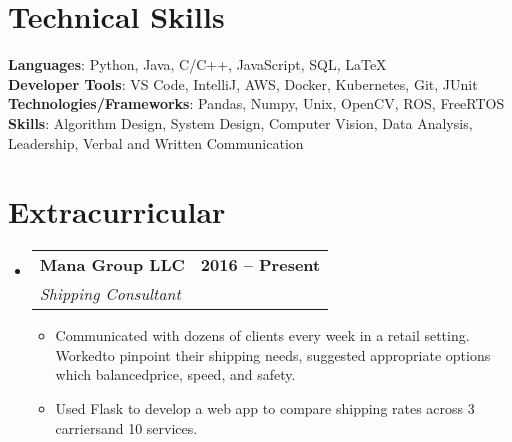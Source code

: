\documentclass[letterpaper,11pt]{article}
\makeatletter
\newcommand{\resumeItem}[1]{
  \item\small{
    {#1 \vspace{-2pt}}
  }
}
\newcommand{\resumeSubheading}[4]{
  \vspace{-2pt}\item
    \begin{tabular*}{1.0\textwidth}[t]{l@{\extracolsep{\fill}}r}
      \textbf{#1} & \textbf{\small #2} \\
      \textit{\small#3} & \textit{\small #4} \\
    \end{tabular*}\vspace{-7pt}
}
\newcommand{\resumeSubHeadingListStart}{\begin{itemize}[leftmargin=0.0in, label={}]}
\newcommand{\resumeSubHeadingListEnd}{\end{itemize}}
\newcommand{\resumeItemListStart}{\begin{itemize}}
\newcommand{\resumeItemListEnd}{\end{itemize}\vspace{-5pt}}
\makeatother
\begin{document}
\section{Technical Skills}
 \begin{itemize}[leftmargin=0.15in, label={}]
    \small{\item{
     \textbf{Languages}{: Python, Java, C/C++, JavaScript, SQL, \LaTeX} \\
     \textbf{Developer Tools}{: VS Code, IntelliJ, AWS, Docker, Kubernetes, Git, JUnit} \\
     \textbf{Technologies/Frameworks}{: Pandas, Numpy, Unix, OpenCV, ROS, FreeRTOS} \\
     \textbf{Skills}{: Algorithm Design, System Design, Computer Vision, Data Analysis, Leadership, Verbal and Written Communication}\\
    }}
 \end{itemize}
 \vspace{-16pt}


\section{Extracurricular}
    \resumeSubHeadingListStart
        \resumeSubheading{Mana Group LLC}{2016 -- Present}{Shipping Consultant}{}
            \resumeItemListStart
                \resumeItem{Communicated with dozens of clients every week in a retail setting. Workedto pinpoint their shipping needs, suggested appropriate options which balancedprice, speed, and safety.}
                \resumeItem{Used Flask to develop a web app to compare shipping rates across 3 carriersand 10 services.}
            \resumeItemListEnd

    \resumeSubHeadingListEnd
\end{document}
